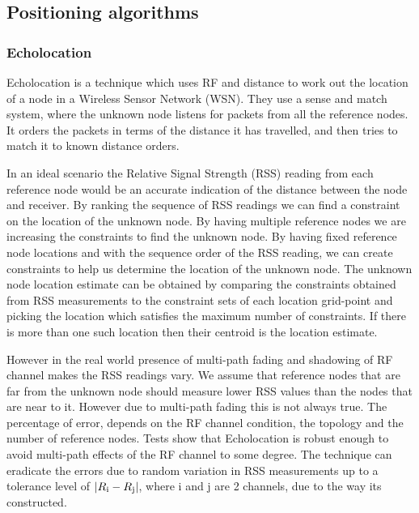 
\subsection{Positioning algorithms}


\subsubsection{Echolocation} \label{ecolocation}

Echolocation\cite{Ecolocation} is a technique which uses RF and distance
to work out the location of a node in a Wireless Sensor Network (WSN).
They use a sense and match system, where the unknown node listens for
packets from all the reference nodes. It orders the packets in terms of the distance it has travelled, and then tries to match it to known distance
orders. 

In an ideal scenario the Relative Signal Strength (RSS) reading from
each reference node would be an accurate indication of the distance
between the node and receiver. By ranking the sequence of RSS readings we can
find a constraint on the location of the unknown node. By having multiple
reference nodes we are increasing the constraints to find the unknown
node. By having fixed reference node locations and with the sequence order
of the RSS reading, we can create constraints to help us determine the location of the unknown
node. The unknown node location estimate can be obtained
by comparing the constraints obtained from RSS measurements to the
constraint sets of each location grid-point and picking the location
which satisfies the maximum number of constraints. If there is more
than one such location then their centroid is the location estimate.

However in the real world presence of multi-path fading and shadowing
of RF channel makes the RSS readings vary. We assume
that reference nodes that are far from the unknown node should measure
lower RSS values than the nodes that are near to it. However due to
multi-path fading this is not always true. The percentage of error,
depends on the RF channel condition, the topology and the number
of reference nodes. Tests show that Echolocation is robust enough to avoid multi-path
effects of the RF channel to some degree\cite{Ecolocation}. The technique can eradicate
the errors due to random variation in RSS measurements up to a tolerance
level of $|R \textsubscript{i}-R \textsubscript{j}| $, where i and j are 2 channels,
due to the way
its constructed.

